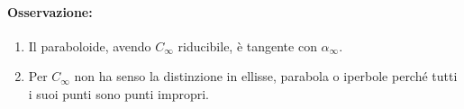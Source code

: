 \paragraph{Osservazione:}
\begin{enumerate}
    \item Il paraboloide, avendo \(C_\infty\) riducibile, è tangente con \(\alpha _{\infty}\).
    \item Per \(C_\infty\) non ha senso la distinzione in ellisse, parabola o iperbole perché tutti i suoi punti sono punti impropri.
\end{enumerate}

